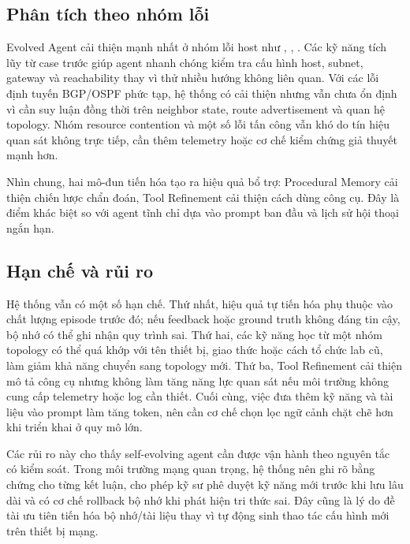 \subsection{Phân tích theo nhóm lỗi}

Evolved Agent cải thiện mạnh nhất ở nhóm lỗi host như , , . Các kỹ năng tích lũy từ case trước giúp agent nhanh chóng kiểm tra cấu hình host, subnet, gateway và reachability thay vì thử nhiều hướng không liên quan. Với các lỗi định tuyến BGP/OSPF phức tạp, hệ thống có cải thiện nhưng vẫn chưa ổn định vì cần suy luận đồng thời trên neighbor state, route advertisement và quan hệ topology. Nhóm resource contention và một số lỗi tấn công vẫn khó do tín hiệu quan sát không trực tiếp, cần thêm telemetry hoặc cơ chế kiểm chứng giả thuyết mạnh hơn.

Nhìn chung, hai mô-đun tiến hóa tạo ra hiệu quả bổ trợ: Procedural Memory cải thiện chiến lược chẩn đoán, Tool Refinement cải thiện cách dùng công cụ. Đây là điểm khác biệt so với agent tĩnh chỉ dựa vào prompt ban đầu và lịch sử hội thoại ngắn hạn.

\subsection{Hạn chế và rủi ro}

Hệ thống vẫn có một số hạn chế. Thứ nhất, hiệu quả tự tiến hóa phụ thuộc vào chất lượng episode trước đó; nếu feedback hoặc ground truth không đáng tin cậy, bộ nhớ có thể ghi nhận quy trình sai. Thứ hai, các kỹ năng học từ một nhóm topology có thể quá khớp với tên thiết bị, giao thức hoặc cách tổ chức lab cũ, làm giảm khả năng chuyển sang topology mới. Thứ ba, Tool Refinement cải thiện mô tả công cụ nhưng không làm tăng năng lực quan sát nếu môi trường không cung cấp telemetry hoặc log cần thiết. Cuối cùng, việc đưa thêm kỹ năng và tài liệu vào prompt làm tăng token, nên cần cơ chế chọn lọc ngữ cảnh chặt chẽ hơn khi triển khai ở quy mô lớn.

Các rủi ro này cho thấy self-evolving agent cần được vận hành theo nguyên tắc có kiểm soát. Trong môi trường mạng quan trọng, hệ thống nên ghi rõ bằng chứng cho từng kết luận, cho phép kỹ sư phê duyệt kỹ năng mới trước khi lưu lâu dài và có cơ chế rollback bộ nhớ khi phát hiện tri thức sai. Đây cũng là lý do đề tài ưu tiên tiến hóa bộ nhớ/tài liệu thay vì tự động sinh thao tác cấu hình mới trên thiết bị mạng.

